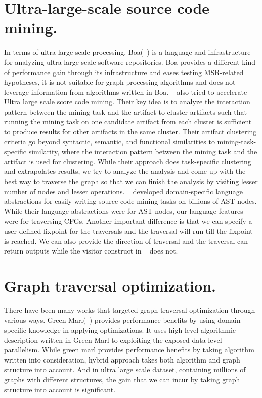 \section{Ultra-large-scale source code mining.}%
In terms of ultra large scale processing, Boa(~\cite{dyer2013boa}) is a 
language and infrastructure for analyzing ultra-large-scale software 
repositories. Boa provides a different kind of performance gain through its 
infrastructure and eases testing MSR-related hypotheses, it is not suitable 
for graph processing algorithms and does not leverage information from 
algorithms written in Boa.
~\cite{upadhyaya2017accelerating} also tried to accelerate Ultra large scale score code mining. Their key idea is to analyze the interaction pattern between the mining task and the artifact to cluster artifacts such that running the mining task on one candidate artifact from each cluster is sufficient to produce results for other artifacts in the same cluster. Their artifact clustering criteria go beyond syntactic, semantic, and functional similarities to mining-task-specific similarity, where the interaction pattern between the mining task and the artifact is used for clustering. While their approach does task-specific clustering and extrapolates results, we try to analyze the analysis and come up with the best way to traverse the graph so that we can finish the analysis by visiting lesser number of nodes and lesser operations.
~\cite{dyer2013declarative} developed domain-specific language abstractions for easily writing source code mining tasks on billions of AST nodes. While their language abstractions were for AST nodes, our language features were for traversing CFGs. Another important difference is that we can specify a user defined fixpoint for the traversals and the traversal will run till the fixpoint is reached. We can also provide the direction of traversal and the traversal can return outputs while the visitor construct in ~\cite{dyer2013declarative} does not.
\section{Graph traversal optimization.}%
There have been many works that targeted graph traversal optimization through 
various ways. Green-Marl(~\cite{hong2012green}) provides performance benefits 
by using domain specific knowledge in applying optimizations. It uses high-level 
algorithmic description written in Green-Marl to exploiting the exposed 
data level parallelism. While green marl provides performance benefits by 
taking algorithm written into consideration, hybrid approach takes both 
algorithm and graph structure into account. And in ultra large scale dataset, 
containing millions of graphs with different structures, the gain that we can 
incur by taking graph structure into account is significant.

